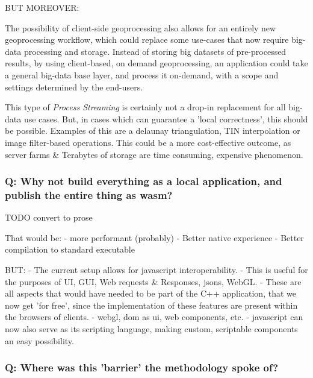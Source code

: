 BUT MOREOVER:

The possibility of client-side geoprocessing also allows for an entirely new geoprocessing workflow, which could replace some use-cases that now require big-data processing and storage. Instead of storing big datasets of pre-processed results, by using client-based, on demand geoprocessing, an application could take a general big-data base layer, and process it on-demand, with a scope and settings determined by the end-users. 

This type of \emph{Process Streaming} is certainly not a drop-in replacement for all big-data use cases. But, in cases which can guarantee a 'local correctness', this should be possible. Examples of this are a delaunay triangulation, TIN interpolation or image filter-based operations. This could be a more cost-effective outcome, as server farms \& Terabytes of storage are time consuming, expensive phenomenon.

\subsubsection*{Q: Why not build everything as a local application, and publish the entire thing as wasm?}

\begin{note}

  TODO convert to prose 

  That would be:
  - more performant (probably)
  - Better native experience
  - Better compilation to standard executable
  
  BUT:
  - The current setup allows for javascript interoperability. 
    - This is useful for the purposes of UI, GUI, Web requests \& Responses, jsons, WebGL.
    - These are all aspects that would have needed to be part of the C++ application, that we now get 'for free', since the implementation of these features are present within the browsers of clients. 
      - webgl, dom as ui, web components, etc.
  - javascript can now also serve as its scripting language, making custom, scriptable components an easy possibility.
  
\end{note}


\subsubsection*{Q: Where was this 'barrier' the methodology spoke of?}

